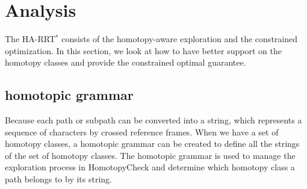 \documentclass[letterpaper, 10 pt, conference]{ieeeconf}
\begin{document}
\section{Analysis}
\label{sec:analysis}

The HA-RRT$^{*}$ consists of the homotopy-aware exploration and the constrained optimization.
In this section, we look at how to have better support on the homotopy classes and provide the constrained optimal guarantee.

\subsection{homotopic grammar}

Because each path or subpath can be converted into a string, which represents a sequence of characters by crossed reference frames.
When we have a set of homotopy classes, a homotopic grammar can be created to define all the strings of the set of homotopy classes.
The homotopic grammar is used to manage the exploration process in {\sc HomotopyCheck} and determine which homotopy class a path belongs to by its string.
\end{document}
